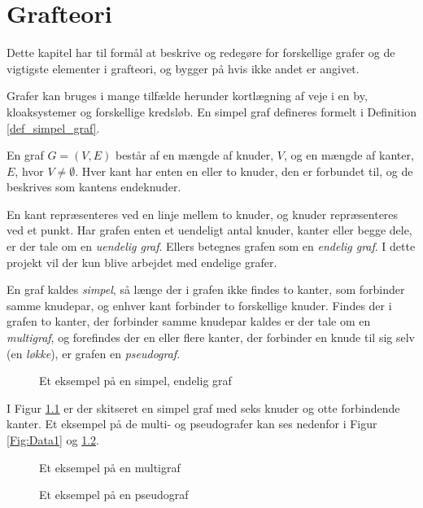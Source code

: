 \chapter{Grafteori}
\usetikzlibrary{arrows, automata}

Dette kapitel har til formål at beskrive og redegøre for forskellige grafer og de vigtigste elementer i grafteori, og bygger på \citep{dmat} hvis ikke andet er angivet. 

Grafer kan bruges i mange tilfælde herunder kortlægning af veje i en by, kloaksystemer og forskellige kredsløb.
En simpel graf defineres formelt i Definition \ref{def_simpel_graf}.


\begin{defn}
En graf $G = (V, E)$ består af en mængde af knuder, $V$, og en mængde af kanter, $E$, hvor $V \neq \emptyset$.
Hver kant har enten en eller to knuder, den er forbundet til, og de beskrives som kantens endeknuder.
\label{def_simpel_graf}
\end{defn}

En kant repræsenteres ved en linje mellem to knuder, og knuder repræsenteres ved et punkt.
Har grafen enten et uendeligt antal knuder, kanter eller begge dele, er der tale om en \textit{uendelig graf}.
Ellers betegnes grafen som en \textit{endelig graf}.
I dette projekt vil der kun blive arbejdet med endelige grafer.

\begin{defn}
En graf kaldes \textit{simpel}, så længe der i grafen ikke findes to kanter, som forbinder samme knudepar, og enhver kant forbinder to forskellige knuder. 
Findes der i grafen to kanter, der forbinder samme knudepar kaldes er der tale om en \textit{multigraf}, og forefindes der en eller flere kanter, der forbinder en knude til sig selv (en \textit{løkke}), er grafen en \textit{pseudograf}.
\end{defn}

\begin{figure}[h]
	\centering
	
	\caption{Et eksempel på en simpel, endelig graf} \label{simpel_graf}
\end{figure}

I Figur \ref{simpel_graf} er der skitseret en simpel graf med seks knuder og otte forbindende kanter. Et eksempel på de multi- og pseudografer kan ses nedenfor i Figur \ref{Fig:Data1} og \ref{Fig:Data2}.

\begin{figure}[!htb]
   \begin{minipage}{0.48\textwidth}
     \centering
     
     \caption{Et eksempel på en multigraf}\label{Fig:Data1}
   \end{minipage}\hfill
   \begin{minipage}{0.48\textwidth}
     \centering
     
     \caption{Et eksempel på en pseudograf}\label{Fig:Data2}
   \end{minipage}
\end{figure}

